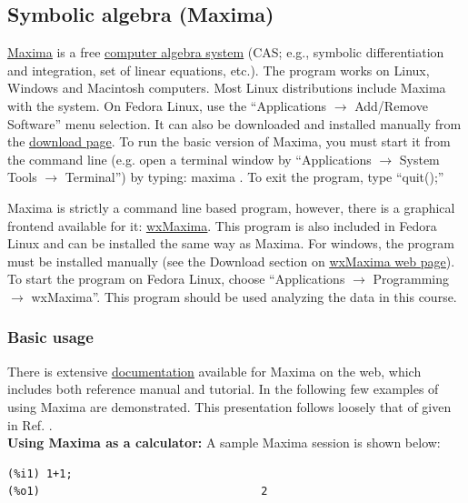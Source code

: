 \documentclass[byrevtex,amssymb,aps,pra,floatfix,letterpaper]{revtex4}
\begin{document}
\subsection{Symbolic algebra (Maxima)}

\href{http://maxima.sourceforge.net/}{\underline{Maxima}} is a free \href{http://en.wikipedia.org/wiki/Computer_algebra_system}{\underline{computer algebra system}} (CAS; e.g., symbolic differentiation and integration, set of linear equations, etc.). The program works on Linux, Windows and Macintosh computers. Most Linux distributions include Maxima with the system. On Fedora Linux, use the ``Applications $\rightarrow$ Add/Remove Software'' menu selection. It can also be downloaded and installed manually from the \href{http://maxima.sourceforge.net/download.shtml}{\underline{download page}}.
To run the basic version of Maxima, you must start it from the command line (e.g. open a terminal window by ``Applications $\rightarrow$ System Tools $\rightarrow$ Terminal'') by typing: maxima . To exit the program, type ``quit();''

Maxima is strictly a command line based program, however, there is a graphical frontend available for it: \href{http://wxmaxima.sourceforge.net/}{\underline{wxMaxima}}. This program is also included in Fedora Linux and can be installed the same way as Maxima. For windows, the program must be installed manually (see the Download section on \href{http://wxmaxima.sourceforge.net/}{\underline{wxMaxima web page}}). To start the program on Fedora Linux, choose ``Applications $\rightarrow$ Programming $\rightarrow$ wxMaxima''. This program should be used analyzing the data in this course.

\subsubsection{Basic usage}

There is extensive \href{http://maxima.sourceforge.net/docs.shtml}{\underline{documentation}} available for Maxima on the web, which includes both reference manual and tutorial. In the following few examples of using Maxima are demonstrated. This presentation follows loosely that of given in Ref. \cite{CANGIANO}.\\

\noindent
\textbf{Using Maxima as a calculator:} A sample Maxima session is shown below:

\begin{verbatim}
(%i1) 1+1;
(%o1)                                  2
\end{verbatim}
\end{document}
